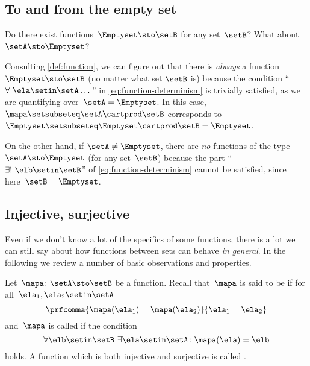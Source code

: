 \subsection{To and from the empty set}

Do there exist functions~$\Emptyset \sto \setB$ for any set~$\setB$?
What about~$\setA \sto \Emptyset$?

Consulting \cref{def:function}, we can figure out that there is \emph{always} a function $\Emptyset \sto \setB$ (no matter what set $\setB$ is) because the condition ``$\forall \ \ela \setin\setA \dots$'' in \cref{eq:function-determinism} is trivially satisfied, as we are quantifying over~$\setA = \Emptyset$.
In this case,~$\mapa \setsubseteq \setA \cartprod \setB$ corresponds to~$\Emptyset \setsubseteq \Emptyset \cartprod \setB = \Emptyset$.

On the other hand, if $\setA \neq \Emptyset$, there are \emph{no} functions of the type~$\setA \sto \Emptyset$ (for any set~$\setB$) because the part ``$\exists ! \ \elb \setin\setB$'' of \cref{eq:function-determinism} cannot be satisfied, since here~$\setB = \Emptyset$.

\subsection{Injective, surjective}

Even if we don't know a lot of the specifics of some functions, there is a lot we can still say about how functions between sets can behave \emph{in general}.
In the following we review a number of basic observations and properties.

Let~$\mapa\colon \setA \sto \setB$ be a function.
Recall that~$\mapa$ is said to be \emph{} if for all~$\ela_1, \ela_2 \setin\setA$
\begin{equation}
    \label{eq:injectivity-cond}
    \prfcomma{
        \mapa(\ela_1) = \mapa(\ela_2)
    }{
        \ela_1 = \ela_2
    }
\end{equation}
and~$\mapa$ is called \emph{} if the condition
\begin{equation}
    \label{eq:surjectivity-cond}
    \forall \elb \setin\setB \ \exists  \ela \setin\setA \colon \mapa(\ela) = \elb
\end{equation}
holds.
A function which is both injective and surjective is called \emph{}.

